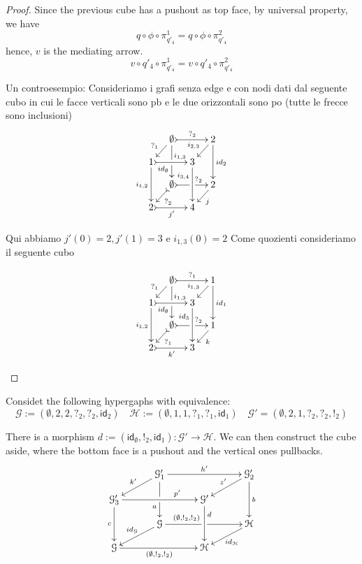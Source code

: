 \documentclass[a4paper,UKenglish,cleveref,pdftex,thm-restate,numberwithinsect]{lipics-v2021}
\newcommand{\id}[1]{\mathsf{id}_{#1}}
\begin{document}
\begin{proof}
	Since the previous cube has a pushout as top face, by universal property, we have
	\[
	q \circ \phi \circ \pi_{q'_4}^1 = q \circ \phi \circ \pi_{q'_4}^2
	\]
	hence, $v$ is the mediating arrow.
	\[
	v \circ q'_4 \circ \pi_{q'_4}^1 = v \circ q'_4 \circ \pi_{q'_4}^2
	\]
	
	
	\begin{example}
		Un controesempio:
		Consideriamo i grafi senza edge e con nodi dati dal seguente cubo in cui le facce verticali sono pb e le due orizzontali sono po (tutte le frecce sono inclusioni)
		\[
	\xymatrix@C=10pt@R=10pt{&\emptyset \ar[dd]|\hole_(.65){\id{\emptyset}}\ar@{>->}[rr]^{?_2} \ar[dl]_{?_1} && 2 \ar[dd]^{\id{2}} \ar[dl]_{i_{2,3}} \\ 1  \ar[dd]_{i_{1,2}}\ar@{>->}[rr]^(.7){i_{1,3}} & & 3 \ar[dd]_(.3){i_{3,4}}\\&\emptyset \ar@{>->}[rr]|\hole^(.65){?_2} \ar@{>->}[dl]^{?_2} && 2 \ar[dl]^{j} \\2 \ar@{>->}[rr]_{j'} & & 4 }
		\] 
		
		Qui abbiamo $j'(0)=2, j'(1)=3$ e  $i_{1,3}(0)=2$
		Come quozienti consideriamo il seguente cubo
		
		\[
		\xymatrix@C=10pt@R=10pt{&\emptyset \ar[dd]|\hole_(.65){\id{\emptyset}}\ar@{>->}[rr]^{?_1} \ar[dl]_{?_1} && 1 \ar[dd]^{\id{1}} \ar[dl]_{i_{1,3}} \\ 1  \ar[dd]_{i_{1,2}}\ar@{>->}[rr]^(.7){i_{1,3}} & & 3 \ar[dd]_(.3){\id{3}}\\&\emptyset \ar@{>->}[rr]|\hole^(.65){?_2} \ar@{>->}[dl]^{?_1} && 1 \ar[dl]^{k} \\2 \ar@{>->}[rr]_{k'} & & 3 }
		\] 
		
		
	\end{example}
	
	
\end{proof}


\begin{example}
	Considet the following hypergaphs with equivalence:
	\[\mathcal{G}:=(\emptyset, 2, 2, ?_{2}, ?_2, \id{2}) \quad \mathcal{H}:=(\emptyset, 1,1, ?_{1}, ?_1, \id{1}) \quad \mathcal{G}'=(\emptyset, 2, 1, ?_{2}, ?_{2}, !_{2}) \]
	
There is a morphism $d:=(\id{\emptyset}, !_2, \id{1})\colon \mathcal{G}'\to \mathcal{H}$. We can then construct the cube aside, where the bottom face is a pushout and the vertical ones pullbacks.
	\[
\xymatrix@C=30pt@R=10pt{&\mathcal{G}_1'\ar[dd]|\hole_(.65){a}\ar[rr]^{h'} \ar[dl]_{k'} && \mathcal{G}_2' \ar[dd]^{b} \ar[dl]_{z'}  \\ 
	\mathcal{G}_3'  \ar[dd]_{c}\ar[rr]^(.7){p'} & & \mathcal{G}' \ar[dd]^(.3){d} \\
	&\mathcal{G}\ar[rr]|\hole^(.3){({\emptyset, !_{2}, !_2})} \ar[dl]_{\id{\mathcal{G}}} && \mathcal{H} \ar[dl]^{\id{\mathcal{H}}}  \\
	\mathcal{G} \ar[rr]_{({\emptyset, !_{2}, !_2})} & & \mathcal{H}  }
\]


\end{example}
\end{document}
